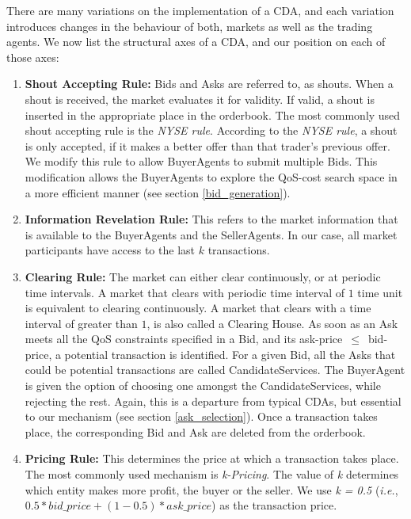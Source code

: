 \documentclass[10pt,journal,compsoc]{IEEEtran}
\begin{document}
There are many variations on the implementation of a CDA, and each variation introduces changes in the behaviour of both, markets as well as the trading agents. We now list the structural axes of a CDA, and our position on each of those axes:
\begin{enumerate}
	\item \textbf{Shout Accepting Rule:} Bids and Asks are referred to, as shouts. When a shout is received, the market evaluates it for validity. If valid, a shout is inserted in the appropriate place in the orderbook. The most commonly used shout accepting rule is the \textit{NYSE rule}. According to the \textit{NYSE rule}, a shout is only accepted, if it makes a better offer than that trader's previous offer\cite{Vytelingum2006Structure}. We modify this rule to allow BuyerAgents to submit multiple Bids. This modification allows the BuyerAgents to explore the QoS-cost search space in a more efficient manner (see section \ref{bid_generation}). 

	\item \textbf{Information Revelation Rule:} This refers to the market information that is available to the BuyerAgents and the SellerAgents. In our case, all market participants have access to the last $k$ transactions.	
	
	\item \textbf{Clearing Rule:} The market can either clear continuously, or at periodic time intervals. A market that clears with periodic time interval of $1$ time unit is equivalent to clearing continuously. A market that clears with a time interval of greater than $1$, is also called a Clearing House. As soon as an Ask meets all the QoS constraints specified in a Bid, and its ask-price~$\leq$~bid-price, a potential transaction is identified. For a given Bid, all the Asks that could be potential transactions are called CandidateServices. The BuyerAgent is given the option of choosing one amongst the CandidateServices, while rejecting the rest. Again, this is a departure from typical CDAs, but essential to our mechanism (see section \ref{ask_selection}). Once a transaction takes place, the corresponding Bid and Ask are deleted from the orderbook.
	
	\item \textbf{Pricing Rule:} This determines the price at which a transaction takes place. The most commonly used mechanism is \textit{k-Pricing}. The value of \textit{k} determines which entity makes more profit, the buyer or the seller. We use \textit{k = 0.5} (\textit{i.e.}, $0.5 * bid\_price + (1 - 0.5) * ask\_price$) as the transaction price. 	
	
\end{enumerate}
\end{document}
